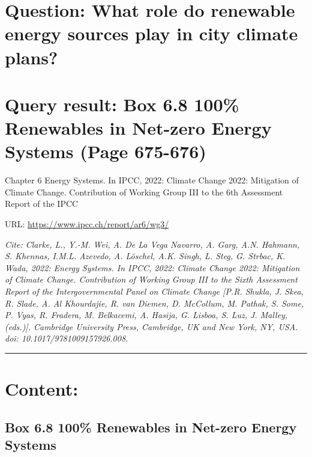 \documentclass[
  letterpaper,
  DIV=11,
  numbers=noendperiod]{scrreprt}
\begin{document}
\hypertarget{question-what-role-do-renewable-energy-sources-play-in-city-climate-plans}{%
\section{Question: What role do renewable energy sources play in city
climate
plans?}\label{question-what-role-do-renewable-energy-sources-play-in-city-climate-plans}}

\hypertarget{query-result-box-6.8-100-renewables-in-net-zero-energy-systems-page-675-676}{%
\section{Query result: Box 6.8 \textbar{} 100\% Renewables in Net-zero
Energy Systems (Page
675-676)}\label{query-result-box-6.8-100-renewables-in-net-zero-energy-systems-page-675-676}}

Chapter 6 Energy Systems. In IPCC, 2022: Climate Change 2022: Mitigation
of Climate Change. Contribution of Working Group III to the 6th
Assessment Report of the IPCC

URL: \url{https://www.ipcc.ch/report/ar6/wg3/}

\emph{Cite: Clarke, L., Y.-M. Wei, A. De La Vega Navarro, A. Garg, A.N.
Hahmann, S. Khennas, I.M.L. Azevedo, A. Löschel, A.K. Singh, L. Steg, G.
Strbac, K. Wada, 2022: Energy Systems. In IPCC, 2022: Climate Change
2022: Mitigation of Climate Change. Contribution of Working Group III to
the Sixth Assessment Report of the Intergovernmental Panel on Climate
Change {[}P.R. Shukla, J. Skea, R. Slade, A. Al Khourdajie, R. van
Diemen, D. McCollum, M. Pathak, S. Some, P. Vyas, R. Fradera, M.
Belkacemi, A. Hasija, G. Lisboa, S. Luz, J. Malley, (eds.){]}. Cambridge
University Press, Cambridge, UK and New York, NY, USA. doi:
10.1017/9781009157926.008.}

\begin{center}\rule{0.5\linewidth}{0.5pt}\end{center}

\hypertarget{content-1}{%
\section{Content:}\label{content-1}}

\hypertarget{box-6.8-100-renewables-in-net-zero-energy-systems}{%
\subsection{Box 6.8 \textbar{} 100\% Renewables in Net-zero Energy
Systems}\label{box-6.8-100-renewables-in-net-zero-energy-systems}}
\end{document}
